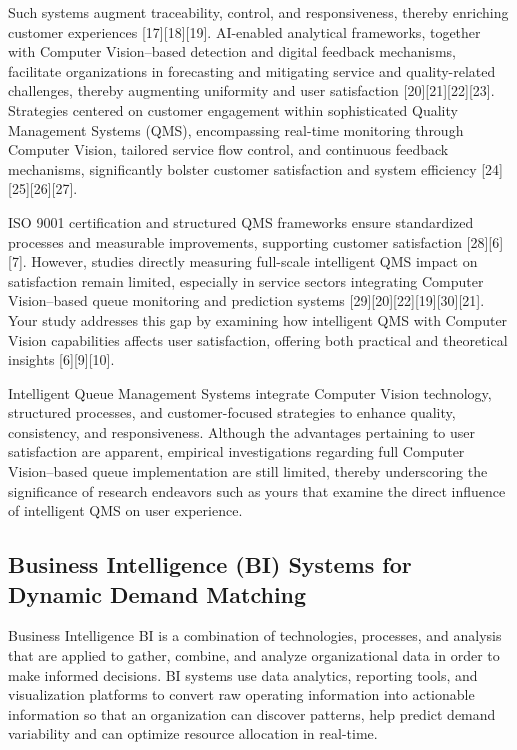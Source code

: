 \documentclass{research}
\begin{document}
Such systems augment traceability, control, and responsiveness, thereby enriching customer experiences [17][18][19]. AI-enabled analytical frameworks, together with Computer Vision–based detection and digital feedback mechanisms, facilitate organizations in forecasting and mitigating service and quality-related challenges, thereby augmenting uniformity and user satisfaction [20][21][22][23]. Strategies centered on customer engagement within sophisticated Quality Management Systems (QMS), encompassing real-time monitoring through Computer Vision, tailored service flow control, and continuous feedback mechanisms, significantly bolster customer satisfaction and system efficiency [24][25][26][27]. 

ISO 9001 certification and structured QMS frameworks ensure standardized processes and measurable improvements, supporting customer satisfaction [28][6][7]. However, studies directly measuring full-scale intelligent QMS impact on satisfaction remain limited, especially in service sectors integrating Computer Vision–based queue monitoring and prediction systems [29][20][22][19][30][21]. Your study addresses this gap by examining how intelligent QMS with Computer Vision capabilities affects user satisfaction, offering both practical and theoretical insights [6][9][10].

Intelligent Queue Management Systems integrate Computer Vision technology, structured processes, and customer-focused strategies to enhance quality, consistency, and responsiveness. Although the advantages pertaining to user satisfaction are apparent, empirical investigations regarding full Computer Vision–based queue implementation are still limited, thereby underscoring the significance of research endeavors such as yours that examine the direct influence of intelligent QMS on user experience. 

\subsection*{Business Intelligence (BI) Systems for Dynamic Demand Matching }
Business Intelligence BI is a combination of technologies, processes, and analysis that are applied to gather, combine, and analyze organizational data in order to make informed decisions. BI systems use data analytics, reporting tools, and visualization platforms to convert raw operating information into actionable information so that an organization can discover patterns, help predict demand variability and can optimize resource allocation in real-time.
\end{document}
